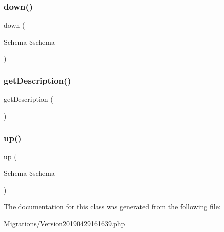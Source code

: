 \subsubsection{\texorpdfstring{down()}{down()}}
{\footnotesize\ttfamily down (\begin{DoxyParamCaption}\item[{Schema}]{\$schema }\end{DoxyParamCaption})}

\mbox{\label{class_doctrine_migrations_1_1_version20190429161639_a2e7bb35c71bf1824456ceb944cb7a845}} 
\subsubsection{\texorpdfstring{getDescription()}{getDescription()}}
{\footnotesize\ttfamily get\+Description (\begin{DoxyParamCaption}{ }\end{DoxyParamCaption})}

\mbox{\label{class_doctrine_migrations_1_1_version20190429161639_a23eb1c1428e8ea2ab2cf798fc06ec421}} 
\subsubsection{\texorpdfstring{up()}{up()}}
{\footnotesize\ttfamily up (\begin{DoxyParamCaption}\item[{Schema}]{\$schema }\end{DoxyParamCaption})}



The documentation for this class was generated from the following file\+:\begin{DoxyCompactItemize}
\item 
Migrations/\mbox{\hyperlink{_version20190429161639_8php}{Version20190429161639.\+php}}\end{DoxyCompactItemize}
